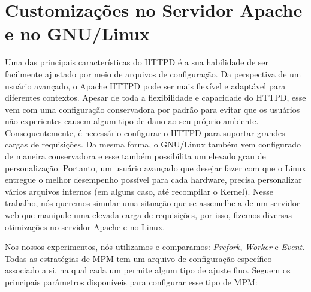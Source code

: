 \section{Customizações no Servidor Apache e no GNU/Linux}
\label{sec:customization}

Uma das principais características do HTTPD é a sua habilidade de ser
facilmente ajustado por meio de arquivos de configuração. Da perspectiva de um
usuário avançado, o Apache HTTPD pode ser mais flexível e adaptável para
diferentes contextos. Apesar de toda a flexibilidade e capacidade do HTTPD,
esse vem com uma configuração conservadora por padrão para evitar que os
usuários não experientes causem algum tipo de dano ao seu próprio ambiente.
Consequentemente, é necessário configurar o HTTPD para suportar grandes cargas
de requisições. Da mesma forma, o GNU/Linux também vem configurado de maneira
conservadora e esse também possibilita um elevado grau de personalização.
Portanto, um usuário avançado que desejar fazer com que o Linux entregue o
melhor desempenho possível para cada hardware, precisa personalizar vários
arquivos internos (em alguns caso, até recompilar o Kernel). Nesse trabalho,
nós queremos simular uma situação que se assemelhe a de um servidor web que
manipule uma elevada carga de requisições, por isso, fizemos diversas
otimizações no servidor Apache e no Linux.

Nos nossos experimentos, nós utilizamos e comparamos: \emph{Prefork},
\emph{Worker} e \emph{Event}. Todas as estratégias de MPM tem um arquivo de
configuração específico associado a si, na qual cada um permite algum tipo de
ajuste fino. Seguem os principais parâmetros disponíveis para configurar esse
tipo de MPM:

